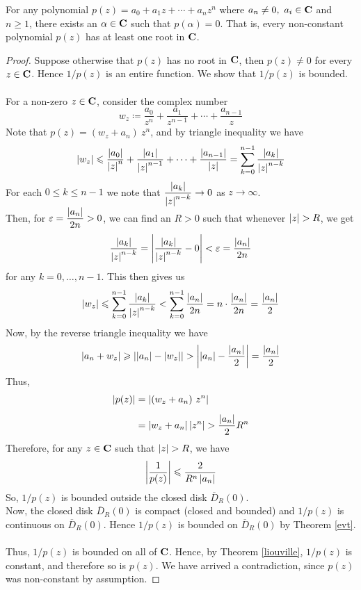 \begin{theorem}
For any polynomial $p(z) = a_0 + a_1z + \cdots + a_nz^n$ where $a_n \neq 0,\ a_i \in \mathbf C$ and $n \geq 1$, there exists an $\alpha \in \mathbf C$ such that $p(\alpha) = 0$. That is, every non-constant polynomial $p(z)$ has at least one root in $\mathbf C$. 
\end{theorem}
\begin{proof}
Suppose otherwise that $p(z)$ has no root in $\mathbf C$, then $p(z) \neq 0$ for every $z \in \mathbf C$. Hence $1/p(z)$ is an entire function. We show that $1/p(z)$ is bounded.\\
\\
For a non-zero $z \in \mathbf C$, consider the complex number
\[w_z \coloneqq \frac{a_0}{z^n} + \frac{a_1}{z^{n-1}} + \cdots + \frac{a_{n-1}}{z}\]
Note that $p(z) = (w_z + a_n)\ z^n$, and by triangle inequality we have
\[\left\lvert w_z\right\rvert \leqslant \frac{\left\lvert a_0\right\rvert}{\left\lvert z\right\rvert^n} + \frac{\left\lvert a_1\right\rvert}{\left\lvert z\right\rvert^{n-1}} + \cdots + \frac{\left\lvert a_{n-1}\right\rvert}{\left\lvert z\right\rvert} = \sum_{k=0}^{n-1}\frac{\left\lvert a_k\right\rvert}{\left\lvert z\right\rvert^{n-k}}\]
For each $0 \leq k \leq n-1$ we note that $\dfrac{\left\lvert a_k\right\rvert}{\left\lvert z\right\rvert^{n-k}} \to 0$ as $z \to \infty$.\\[0.5em]
Then, for $\varepsilon = \dfrac{\left\lvert a_n\right\rvert}{2n} > 0$, we can find an $R > 0$ such that whenever $\left\lvert z\right\rvert > R$, we get
\[\frac{\left\lvert a_k\right\rvert}{\left\lvert z\right\rvert^{n-k}} = \left\lvert\frac{\left\lvert a_k\right\rvert}{\left\lvert z\right\rvert^{n-k}} - 0\right\rvert < \varepsilon = \frac{\left\lvert a_n\right\rvert}{2n}\]
for any $k = 0,\ldots,n-1$. This then gives us
\[\left\lvert w_z\right\rvert \leqslant \sum_{k=0}^{n-1}\frac{\left\lvert a_k\right\rvert}{\left\lvert z\right\rvert^{n-k}} < \sum_{k=0}^{n-1}\frac{\left\lvert a_n\right\rvert}{2n} = n\cdot \frac{\left\lvert a_n\right\rvert}{2n} = \frac{\left\lvert a_n\right\rvert}{2}\]
Now, by the reverse triangle inequality we have
\[\left\lvert a_n + w_z\right\rvert \geqslant \left\lvert\left\lvert a_n\right\rvert - \left\lvert w_z\right\rvert\right\rvert > \left\lvert\left\lvert a_n\right\rvert - \frac{\left\lvert a_n\right\rvert}{2}\right\rvert = \frac{\left\lvert a_n\right\rvert}{2}\]
Thus, 
\begin{align*}
\left\lvert p(z)\right\rvert &= \left\lvert(w_z + a_n)\ z^n\right\rvert\\[0.5em]
&= \left\lvert w_z + a_n\right\rvert\left\lvert z^n\right\rvert > \frac{\left\lvert a_n\right\rvert}{2}R^n
\end{align*}
Therefore, for any $z \in \mathbf C$ such that $\left\lvert z\right\rvert > R$, we have
\[\left\lvert\frac{1}{p(z)}\right\rvert \leqslant \frac{2}{R^n\left\lvert a_n\right\rvert}\]
So, $1/p(z)$ is bounded outside the closed disk $\overline{D}_R(0)$.\\[0.5em]
Now, the closed disk $\overline{D}_R(0)$ is compact (closed and bounded) and $1/p(z)$ is continuous on $\overline{D}_R(0)$. Hence $1/p(z)$ is bounded on $\overline{D}_R(0)$ by Theorem \ref{evt}.\\
\\
Thus, $1/p(z)$ is bounded on all of $\mathbf C$. Hence, by Theorem \ref{liouville}, $1/p(z)$ is constant, and therefore so is $p(z)$. We have arrived a contradiction, since $p(z)$ was non-constant by assumption. 
\end{proof}

